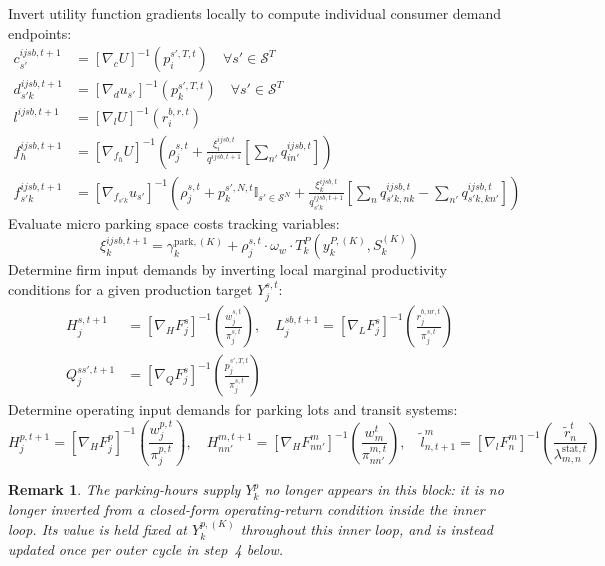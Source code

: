 \documentclass[11pt,a4paper]{article}
\newtheorem{remark}{Remark}
\begin{document}
\begin{enumerate}
\begin{enumerate}
\begin{enumerate}
            Invert utility function gradients locally to compute individual consumer demand endpoints:
            \begin{align}
                c^{ijsb, t+1}_{s'} &= \left[ \nabla_c U \right]^{-1} \left( p^{s',T,t}_i \right) \quad \forall s' \in \mathcal{S}^T \\
                d^{ijsb, t+1}_{s'k} &= \left[ \nabla_d u_{s'} \right]^{-1} \left( p^{s',T,t}_k \right) \quad \forall s' \in \mathcal{S}^T \\
                l^{ijsb, t+1} &= \left[ \nabla_l U \right]^{-1} \left( r^{b,r,t}_i \right) \\
                f^{ijsb, t+1}_h &= \left[ \nabla_{f_h} U \right]^{-1} \left( \rho^{s,t}_j + \frac{\xi^{ijsb,t}_i}{q^{ijsb,t+1}} \left[ \sum_{n'} q^{ijsb,t}_{in'} \right] \right) \\
                f^{ijsb, t+1}_{s'k} &= \left[ \nabla_{f_{s'k}} u_{s'} \right]^{-1} \left( \rho^{s,t}_j + p^{s',N,t}_k \mathbb{I}_{s' \in \mathcal{S}^N} + \frac{\xi^{ijsb,t}_k}{q^{ijsb,t+1}_{s'k}} \left[ \sum_n q^{ijsb,t}_{s'k,nk} - \sum_{n'} q^{ijsb,t}_{s'k,kn'} \right] \right)
            \end{align}
            Evaluate micro parking space costs tracking variables:
            \begin{equation}
                \xi^{ijsb, t+1}_k = \gamma^{\text{park}, (K)}_k + \rho^{s,t}_j \cdot \omega_w \cdot T^P_k(y_k^{P,(K)}, S_k^{(K)})
            \end{equation}
            Determine firm input demands by inverting local marginal productivity conditions for a given production target $Y_j^{s,t}$:
            \begin{align}
                H_j^{s, t+1} &= \left[ \nabla_H F_j^s \right]^{-1} \left( \frac{w^{s,t}_j}{\pi^{s,t}_j} \right), \quad L_j^{sb, t+1} = \left[ \nabla_L F_j^s \right]^{-1} \left( \frac{r^{b,nr,t}_j}{\pi^{s,t}_j} \right) \\
                Q_j^{ss', t+1} &= \left[ \nabla_Q F_j^s \right]^{-1} \left( \frac{p^{s',T,t}_j}{\pi^{s,t}_j} \right)
            \end{align}
            Determine operating input demands for parking lots and transit systems:
            \begin{equation}
                H_j^{p, t+1} = \left[ \nabla_H F_j^p \right]^{-1} \left( \frac{w^{p,t}_j}{\pi^{p,t}_j} \right), \quad H_{nn'}^{m, t+1} = \left[ \nabla_H F_{nn'}^m \right]^{-1} \left( \frac{w_m^t}{\pi^{m,t}_{nn'}} \right), \quad \tilde l^m_{n, t+1} = \left[ \nabla_l F_n^m \right]^{-1} \left( \frac{\tilde r_n^t}{\lambda^{\text{stat},t}_{m,n}} \right)
            \end{equation}
            \begin{remark}
            The parking-hours supply $Y_k^p$ no longer appears in this block: it is no longer inverted from a closed-form operating-return condition inside the inner loop. Its value is held fixed at $Y_k^{p,(K)}$ throughout this inner loop, and is instead updated once per outer cycle in step~4 below.
            \end{remark}


\end{enumerate}
\end{enumerate}
\end{enumerate}
\end{document}
